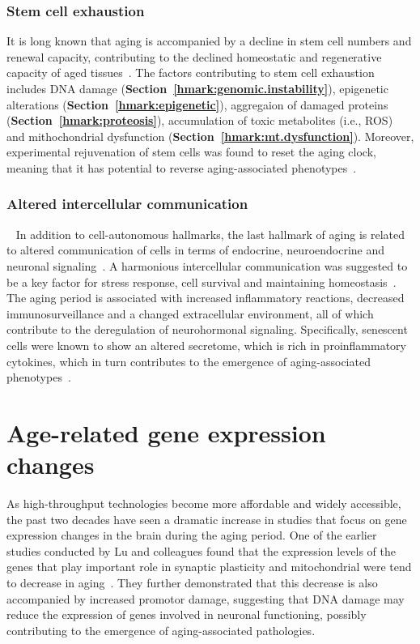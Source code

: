 \subsubsection{Stem cell exhaustion}
It is long known that aging is accompanied by a decline in stem cell numbers and renewal capacity, 
contributing to the declined homeostatic and regenerative capacity of aged tissues~\autocite{Oh2014}.
The factors contributing to stem cell exhaustion includes
DNA damage (\textbf{Section~\ref{hmark:genomic.instability}}), 
epigenetic alterations (\textbf{Section~\ref{hmark:epigenetic}}), 
aggregaion of damaged proteins (\textbf{Section~\ref{hmark:proteosis}}),
accumulation of toxic metabolites (i.e., ROS) and
mithochondrial dysfunction (\textbf{Section~\ref{hmark:mt.dysfunction}}).
Moreover, experimental rejuvenation of stem cells was found to reset the aging clock, 
meaning that it has potential to reverse aging-associated phenotypes~\autocite{Rando2012}.

\subsubsection{Altered intercellular communication}~\label{hmark:altered.comm}
In addition to cell-autonomous hallmarks, the last hallmark of aging is related to altered communication of cells 
in terms of endocrine, neuroendocrine and neuronal signaling~\autocite{Russell2007}.
A harmonious intercellular communication was suggested to be a key factor for stress response, cell survival and maintaining homeostasis~\autocite{Tan2021}.
The aging period is associated with increased inflammatory reactions, decreased immunosurveillance and a changed extracellular environment,
all of which contribute to the deregulation of neurohormonal signaling.
Specifically, senescent cells were known to show an altered secretome, which is rich in proinflammatory cytokines, 
which in turn contributes to the emergence of aging-associated phenotypes~\autocite{Childs2016, Kuilman2010}.

\section{Age-related gene expression changes}
As high-throughput technologies become more affordable and widely accessible, 
the past two decades have seen a dramatic increase in studies that focus on gene expression changes in the brain during the aging period.
One of the earlier studies conducted by Lu and colleagues found that the expression levels of the genes 
that play important role in synaptic plasticity and mitochondrial were tend to decrease in aging~\autocite{Lu2004}. 
They further demonstrated that this decrease is also accompanied by increased promotor damage, 
suggesting that DNA damage may reduce the expression of genes involved in neuronal functioning, 
possibly contributing to the emergence of aging-associated pathologies.


